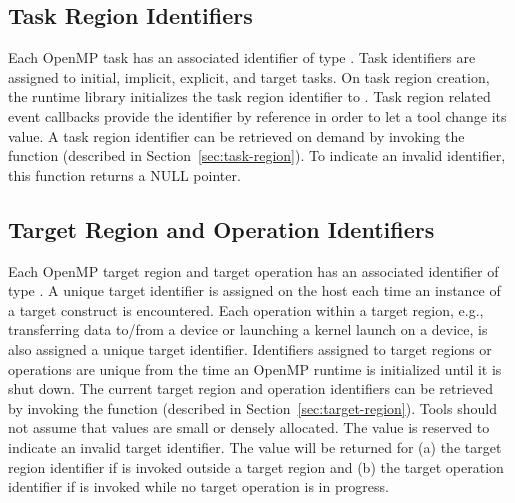 \documentclass{article}
\begin{document}
  \subsection{Task Region Identifiers}
  Each OpenMP task has an associated identifier of type . 
  Task identifiers are assigned to initial, implicit, explicit, and target tasks.
  On task region creation, the runtime library initializes the task region identifier to .
  Task region related event callbacks provide the identifier by reference in order to let a tool change its value.
  A task region identifier can be retrieved on demand by invoking the  function (described in Section~\ref{sec:task-region}).
  To indicate an invalid identifier, this function returns a NULL pointer.
  
\subsection{Target Region and Operation Identifiers}
Each OpenMP target region and target operation has an associated identifier of type . 
A unique target identifier is assigned on the host each time an instance of a target construct is encountered.
Each operation within a target region, e.g., transferring data to/from a device or launching a kernel launch 
on a device, is also assigned a unique target identifier. 
Identifiers assigned to target regions or operations 
are unique from the time an OpenMP runtime is initialized until it is shut down. 
The current target region and operation identifiers can be retrieved by invoking the  function (described in Section~\ref{sec:target-region}).
Tools should not assume that  values are small or densely allocated. 
The value  is reserved to indicate an invalid target identifier. 
The value  will be returned for (a) the target region identifier if  is invoked outside a target region and (b) the target operation identifier if  is invoked while no target operation is in progress.
\end{document}

